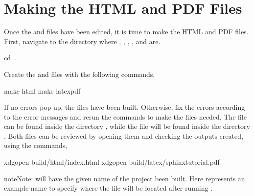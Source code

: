 \documentclass[letterpaper,10pt,english]{sphinxhowto}
\begin{document}
\section{Making the HTML and PDF Files}
\label{\detokenize{index:making-the-html-and-pdf-files}}
\sphinxAtStartPar
Once the  and  files have been edited, it is time to make the HTML and PDF files. First, navigate to the  directory where , , , , and  are.

\begin{sphinxVerbatim}[commandchars=\\\{\}]
\PYGZdl{} cd ..
\end{sphinxVerbatim}

\sphinxAtStartPar
Create the  and  files with the following commands,

\begin{sphinxVerbatim}[commandchars=\\\{\}]
\PYGZdl{} make html
\PYGZdl{} make latexpdf
\end{sphinxVerbatim}

\sphinxAtStartPar
If no errors pop up, the files have been built. Otherwise, fix the errors according to the error messages and re\sphinxhyphen{}run the commands to make the files needed. The  file can be found inside the directory , while the  file will be found inside the directory . Both files can be reviewed by opening them and checking the outputs created, using the  commands,

\begin{sphinxVerbatim}[commandchars=\\\{\}]
\PYGZdl{} xdg\PYGZhy{}open build/html/index.html
\PYGZdl{} xdg\PYGZhy{}open build/latex/sphinx\PYGZhy{}tutorial.pdf
\end{sphinxVerbatim}

\begin{sphinxadmonition}{note}{Note:}
\sphinxAtStartPar
{} will have the given name of the project been built. Here  represents an example name to specify where the file will be located after running .
\end{sphinxadmonition}
\end{document}
